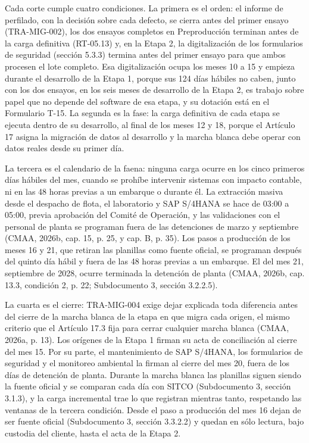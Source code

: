 \documentclass[subdoc]{../../comun/overfore}
\begin{document}
Cada corte cumple cuatro condiciones. La primera es el orden: el informe de perfilado, con la decisión sobre cada defecto, se cierra antes del primer ensayo (TRA-MIG-002), los dos ensayos completos en Preproducción terminan antes de la carga definitiva (RT-05.13) y, en la Etapa 2, la digitalización de los formularios de seguridad (sección 5.3.3) termina antes del primer ensayo para que ambos procesen el lote completo. Esa digitalización ocupa los meses 10 a 15 y empieza durante el desarrollo de la Etapa 1, porque sus 124 días hábiles no caben, junto con los dos ensayos, en los seis meses de desarrollo de la Etapa 2, es trabajo sobre papel que no depende del software de esa etapa, y su dotación está en el Formulario T-15. La segunda es la fase: la carga definitiva de cada etapa se ejecuta dentro de su desarrollo, al final de los meses 12 y 18, porque el Artículo 17 asigna la migración de datos al desarrollo y la marcha blanca debe operar con datos reales desde su primer día.

La tercera es el calendario de la faena: ninguna carga ocurre en los cinco primeros días hábiles del mes, cuando se prohíbe intervenir sistemas con impacto contable, ni en las 48 horas previas a un embarque o durante él. La extracción masiva desde el despacho de flota, el laboratorio y SAP S/4HANA se hace de 03:00 a 05:00, previa aprobación del Comité de Operación, y las validaciones con el personal de planta se programan fuera de las detenciones de marzo y septiembre (CMAA, 2026b, cap. 15, p. 25, y cap. B, p. 35). Los pasos a producción de los meses 16 y 21, que retiran las planillas como fuente oficial, se programan después del quinto día hábil y fuera de las 48 horas previas a un embarque. El del mes 21, septiembre de 2028, ocurre terminada la detención de planta (CMAA, 2026b, cap. 13.3, condición 2, p. 22; Subdocumento 3, sección 3.2.2.5).

La cuarta es el cierre: TRA-MIG-004 exige dejar explicada toda diferencia antes del cierre de la marcha blanca de la etapa en que migra cada origen, el mismo criterio que el Artículo 17.3 fija para cerrar cualquier marcha blanca (CMAA, 2026a, p. 13). Los orígenes de la Etapa 1 firman su acta de conciliación al cierre del mes 15. Por su parte, el mantenimiento de SAP S/4HANA, los formularios de seguridad y el monitoreo ambiental la firman al cierre del mes 20, fuera de los días de detención de planta. Durante la marcha blanca las planillas siguen siendo la fuente oficial y se comparan cada día con SITCO (Subdocumento 3, sección 3.1.3), y la carga incremental trae lo que registran mientras tanto, respetando las ventanas de la tercera condición. Desde el paso a producción del mes 16 dejan de ser fuente oficial (Subdocumento 3, sección 3.3.2.2) y quedan en sólo lectura, bajo custodia del cliente, hasta el acta de la Etapa 2.
\end{document}
